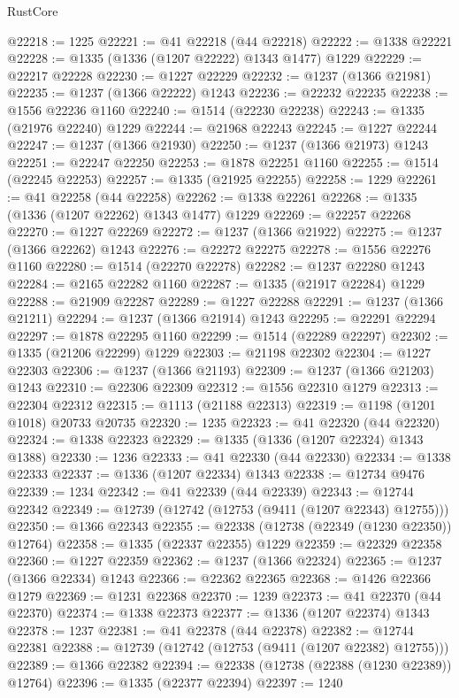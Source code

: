 \begin{lexlean}{RustCore}
\begin{coremodule}
@22218 := 1225
@22221 := @41 @22218 (@44 @22218)
@22222 := @1338 @22221
@22228 := @1335 (@1336 (@1207 @22222) @1343 @1477) @1229
@22229 := @22217 @22228
@22230 := @1227 @22229
@22232 := @1237 (@1366 @21981)
@22235 := @1237 (@1366 @22222) @1243
@22236 := @22232 @22235
@22238 := @1556 @22236 @1160
@22240 := @1514 (@22230 @22238)
@22243 := @1335 (@21976 @22240) @1229
@22244 := @21968 @22243
@22245 := @1227 @22244
@22247 := @1237 (@1366 @21930)
@22250 := @1237 (@1366 @21973) @1243
@22251 := @22247 @22250
@22253 := @1878 @22251 @1160
@22255 := @1514 (@22245 @22253)
@22257 := @1335 (@21925 @22255)
@22258 := 1229
@22261 := @41 @22258 (@44 @22258)
@22262 := @1338 @22261
@22268 := @1335 (@1336 (@1207 @22262) @1343 @1477) @1229
@22269 := @22257 @22268
@22270 := @1227 @22269
@22272 := @1237 (@1366 @21922)
@22275 := @1237 (@1366 @22262) @1243
@22276 := @22272 @22275
@22278 := @1556 @22276 @1160
@22280 := @1514 (@22270 @22278)
@22282 := @1237 @22280 @1243
@22284 := @2165 @22282 @1160
@22287 := @1335 (@21917 @22284) @1229
@22288 := @21909 @22287
@22289 := @1227 @22288
@22291 := @1237 (@1366 @21211)
@22294 := @1237 (@1366 @21914) @1243
@22295 := @22291 @22294
@22297 := @1878 @22295 @1160
@22299 := @1514 (@22289 @22297)
@22302 := @1335 (@21206 @22299) @1229
@22303 := @21198 @22302
@22304 := @1227 @22303
@22306 := @1237 (@1366 @21193)
@22309 := @1237 (@1366 @21203) @1243
@22310 := @22306 @22309
@22312 := @1556 @22310 @1279
@22313 := @22304 @22312
@22315 := @1113 (@21188 @22313)
@22319 := @1198 (@1201 @1018) @20733 @20735
@22320 := 1235
@22323 := @41 @22320 (@44 @22320)
@22324 := @1338 @22323
@22329 := @1335 (@1336 (@1207 @22324) @1343 @1388)
@22330 := 1236
@22333 := @41 @22330 (@44 @22330)
@22334 := @1338 @22333
@22337 := @1336 (@1207 @22334) @1343
@22338 := @12734 @9476
@22339 := 1234
@22342 := @41 @22339 (@44 @22339)
@22343 := @12744 @22342
@22349 := @12739 (@12742 (@12753 (@9411 (@1207 @22343) @12755)))
@22350 := @1366 @22343
@22355 := @22338 (@12738 (@22349 (@1230 @22350)) @12764)
@22358 := @1335 (@22337 @22355) @1229
@22359 := @22329 @22358
@22360 := @1227 @22359
@22362 := @1237 (@1366 @22324)
@22365 := @1237 (@1366 @22334) @1243
@22366 := @22362 @22365
@22368 := @1426 @22366 @1279
@22369 := @1231 @22368
@22370 := 1239
@22373 := @41 @22370 (@44 @22370)
@22374 := @1338 @22373
@22377 := @1336 (@1207 @22374) @1343
@22378 := 1237
@22381 := @41 @22378 (@44 @22378)
@22382 := @12744 @22381
@22388 := @12739 (@12742 (@12753 (@9411 (@1207 @22382) @12755)))
@22389 := @1366 @22382
@22394 := @22338 (@12738 (@22388 (@1230 @22389)) @12764)
@22396 := @1335 (@22377 @22394)
@22397 := 1240

\end{coremodule}
\end{lexlean}
